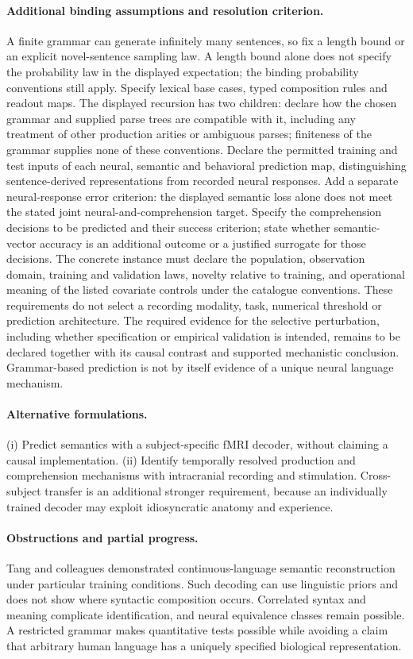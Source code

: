 \documentclass[11pt]{article}
\begin{document}
\paragraph{Additional binding assumptions and resolution criterion.} A finite grammar can generate infinitely many sentences, so fix a length bound or an explicit novel-sentence sampling law. A length bound alone does not specify the probability law in the displayed expectation; the binding probability conventions still apply. Specify lexical base cases, typed composition rules and readout maps. The displayed recursion has two children: declare how the chosen grammar and supplied parse trees are compatible with it, including any treatment of other production arities or ambiguous parses; finiteness of the grammar supplies none of these conventions. Declare the permitted training and test inputs of each neural, semantic and behavioral prediction map, distinguishing sentence-derived representations from recorded neural responses. Add a separate neural-response error criterion: the displayed semantic loss alone does not meet the stated joint neural-and-comprehension target. Specify the comprehension decisions to be predicted and their success criterion; state whether semantic-vector accuracy is an additional outcome or a justified surrogate for those decisions. The concrete instance must declare the population, observation domain, training and validation laws, novelty relative to training, and operational meaning of the listed covariate controls under the catalogue conventions. These requirements do not select a recording modality, task, numerical threshold or prediction architecture. The required evidence for the selective perturbation, including whether specification or empirical validation is intended, remains to be declared together with its causal contrast and supported mechanistic conclusion. Grammar-based prediction is not by itself evidence of a unique neural language mechanism.

\paragraph{Alternative formulations.} (i) Predict semantics with a subject-specific fMRI decoder, without claiming a causal implementation. (ii) Identify temporally resolved production and comprehension mechanisms with intracranial recording and stimulation. Cross-subject transfer is an additional stronger requirement, because an individually trained decoder may exploit idiosyncratic anatomy and experience.
\paragraph{Obstructions and partial progress.} Tang and colleagues demonstrated continuous-language semantic reconstruction under particular training conditions. Such decoding can use linguistic priors and does not show where syntactic composition occurs. Correlated syntax and meaning complicate identification, and neural equivalence classes remain possible. A restricted grammar makes quantitative tests possible while avoiding a claim that arbitrary human language has a uniquely specified biological representation.
\end{document}
